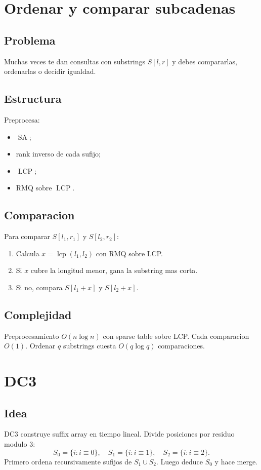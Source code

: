 \documentclass[10pt]{article}
\newcommand{\bigO}{O}
\newcommand{\SA}{\operatorname{SA}}
\newcommand{\LCP}{\operatorname{LCP}}
\begin{document}
\newpage
\section{Ordenar y comparar subcadenas}

\subsection{Problema}
Muchas veces te dan consultas con substrings $S[l,r]$ y debes compararlas,
ordenarlas o decidir igualdad.

\subsection{Estructura}
Preprocesa:
\begin{itemize}[leftmargin=*]
\item $\SA$;
\item rank inverso de cada sufijo;
\item $\LCP$;
\item RMQ sobre $\LCP$.
\end{itemize}

\subsection{Comparacion}
Para comparar $S[l_1,r_1]$ y $S[l_2,r_2]$:
\begin{enumerate}[leftmargin=*]
\item Calcula $x=\operatorname{lcp}(l_1,l_2)$ con RMQ sobre LCP.
\item Si $x$ cubre la longitud menor, gana la substring mas corta.
\item Si no, compara $S[l_1+x]$ y $S[l_2+x]$.
\end{enumerate}

\subsection{Complejidad}
Preprocesamiento $\bigO(n\log n)$ con sparse table sobre LCP. Cada comparacion
$\bigO(1)$. Ordenar $q$ substrings cuesta $\bigO(q\log q)$ comparaciones.

\newpage
\section{DC3}

\subsection{Idea}
DC3 construye suffix array en tiempo lineal. Divide posiciones por residuo
modulo 3:
\[
S_0=\{i:i\equiv0\},\quad S_1=\{i:i\equiv1\},\quad S_2=\{i:i\equiv2\}.
\]
Primero ordena recursivamente sufijos de $S_1\cup S_2$. Luego deduce $S_0$ y
hace merge.
\end{document}
